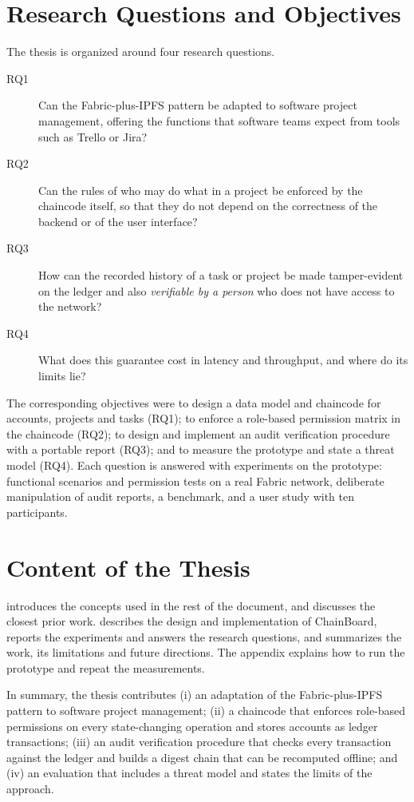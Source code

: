 \section{Research Questions and Objectives}
\label{sec:rqs}

The thesis is organized around four research questions.

\begin{description}
    \item[RQ1] Can the Fabric-plus-IPFS pattern be adapted to software project management, offering the functions that software teams expect from tools such as Trello or Jira?
    \item[RQ2] Can the rules of who may do what in a project be enforced by the chaincode itself, so that they do not depend on the correctness of the backend or of the user interface?
    \item[RQ3] How can the recorded history of a task or project be made tamper-evident on the ledger and also \emph{verifiable by a person} who does not have access to the network?
    \item[RQ4] What does this guarantee cost in latency and throughput, and where do its limits lie?
\end{description}

The corresponding objectives were to design a data model and chaincode for accounts, projects and tasks (RQ1); to enforce a role-based permission matrix in the chaincode (RQ2); to design and implement an audit verification procedure with a portable report (RQ3); and to measure the prototype and state a threat model (RQ4). Each question is answered with experiments on the prototype: functional scenarios and permission tests on a real Fabric network, deliberate manipulation of audit reports, a benchmark, and a user study with ten participants.

\section{Content of the Thesis}
\label{sec:content}

 introduces the concepts used in the rest of the document, and  discusses the closest prior work.  describes the design and implementation of ChainBoard,  reports the experiments and answers the research questions, and  summarizes the work, its limitations and future directions. The appendix explains how to run the prototype and repeat the measurements.

In summary, the thesis contributes (i) an adaptation of the Fabric-plus-IPFS pattern to software project management; (ii) a chaincode that enforces role-based permissions on every state-changing operation and stores accounts as ledger transactions; (iii) an audit verification procedure that checks every transaction against the ledger and builds a digest chain that can be recomputed offline; and (iv) an evaluation that includes a threat model and states the limits of the approach.
